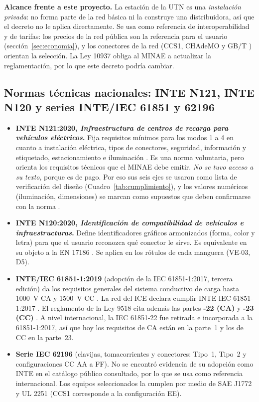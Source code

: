 \textbf{Alcance frente a este proyecto.} La estación de la UTN es una \emph{instalación privada}: no forma parte de la red básica ni la construye una distribuidora, así que el decreto no le aplica directamente. Se usa como referencia de interoperabilidad y de tarifas: los precios de la red pública son la referencia para el usuario (sección~\ref{sec:economia}), y los conectores de la red (CCS1, CHAdeMO y GB/T \cite{delfinoAresep}) orientan la selección. La Ley 10937 obliga al MINAE a actualizar la reglamentación, por lo que este decreto podría cambiar.

\subsection{Normas técnicas nacionales: INTE N121, INTE N120 y series INTE/IEC 61851 y 62196}
\begin{itemize}
\item \textbf{INTE N121:2020, \emph{Infraestructura de centros de recarga para vehículos eléctricos}.} Fija requisitos mínimos para los modos 1 a 4 en cuanto a instalación eléctrica, tipos de conectores, seguridad, información y etiquetado, estacionamiento e iluminación \cite{intecoBlog}. Es una norma voluntaria, pero orienta los requisitos técnicos que el MINAE debe emitir. \emph{No se tuvo acceso a su texto}, porque es de pago. Por eso sus seis ejes se usaron como lista de verificación del diseño (Cuadro~\ref{tab:cumplimiento}), y los valores numéricos (iluminación, dimensiones) se marcan como supuestos que deben confirmarse con la norma \supuesto{}.
\item \textbf{INTE N120:2020, \emph{Identificación de compatibilidad de vehículos e infraestructuras}.} Define identificadores gráficos armonizados (forma, color y letra) para que el usuario reconozca qué conector le sirve. Es equivalente en su objeto a la EN 17186 \cite{intecoBlog}. Se aplica en los rótulos de cada manguera (VE-03, D5).
\item \textbf{INTE/IEC 61851-1:2019} (adopción de la IEC 61851-1:2017, tercera edición) da los requisitos generales del sistema conductivo de carga hasta 1000~V CA y 1500~V CC \cite{intecoBlog}. La red del ICE declara cumplir INTE-IEC 61851-1:2017 \cite{delfinoAresep}. El reglamento de la Ley 9518 cita además las partes \textbf{-22 (CA)} y \textbf{-23 (CC)} \cite{dec41428}. A nivel internacional, la IEC 61851-22 fue retirada e incorporada a la 61851-1:2017, así que hoy los requisitos de CA están en la parte~1 y los de CC en la parte~23.
\item \textbf{Serie IEC 62196} (clavijas, tomacorrientes y conectores: Tipo~1, Tipo~2 y configuraciones CC AA a FF). No se encontró evidencia de su adopción como INTE en el catálogo público consultado, por lo que se usa como referencia internacional. Los equipos seleccionados la cumplen por medio de SAE J1772 y UL 2251 (CCS1 corresponde a la configuración EE).
\end{itemize}
